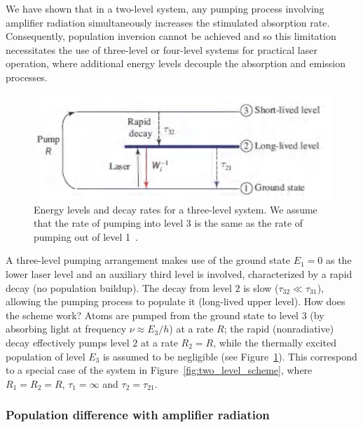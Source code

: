 \documentclass[prl,twocolumn]{revtex4-1}
\begin{document}
We have shown that in a two-level system, any pumping process involving amplifier radiation simultaneously increases the stimulated absorption rate. Consequently, population inversion cannot be achieved and so this limitation necessitates the use of three-level or four-level systems for practical laser operation, where additional energy levels decouple the absorption and emission processes.

\begin{figure}[!t]
    \centering
    \includegraphics[width=0.9\linewidth]{Images/three_level_scheme.png}
    \caption{Energy levels and decay rates for a three-level system. We assume that the rate of pumping into level 3 is the same as the rate of pumping out of level 1~\cite{Saleh2007}.}
    \label{fig:three_level_scheme}
\end{figure}

A three-level pumping arrangement makes use of the ground state $E_1 = 0$ as the lower laser level and an auxiliary third level is involved, characterized by a rapid decay (no population buildup). The decay from level $2$ is slow ($\tau_{32} \ll \tau_{31}$), allowing the pumping process to populate it (long-lived upper level). How does the scheme work? Atoms are pumped from the ground state to level $3$ (by absorbing light at frequency $\nu \approx E_3/h$) at a rate $R$; the rapid (nonradiative) decay effectively pumps level $2$ at a rate $R_2 = R$, while the thermally excited population of level $E_3$ is assumed to be negligible (see Figure~\ref{fig:three_level_scheme}). This correspond to a special case of the system in Figure~\ref{fig:two_level_scheme}, where $R_1=R_2=R$, $\tau_1=\infty$ and $\tau_2=\tau_{21}$. 

\subsubsection{\textbf{Population difference with amplifier radiation}}
\end{document}
